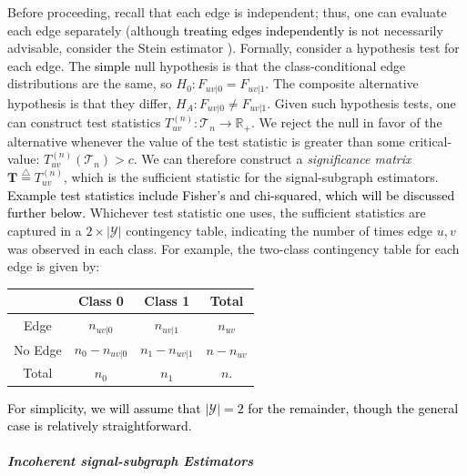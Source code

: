 \documentclass[10pt,journal,cspaper,compsoc]{IEEEtran}
\providecommand{\tk}[1]{\textcolor{black}{#1}}
\providecommand{\mc}[1]{\mathcal{#1}}
\providecommand{\mb}[1]{\boldsymbol{#1}}
\newcommand{\Real}{\mathbb{R}}
\newcommand{\defeq}{\overset{\triangle}{=}}
\begin{document}
Before proceeding, recall that each edge is independent; thus, one can evaluate each edge separately (although \tk{treating edges independently is} not necessarily advisable, consider the Stein estimator \cite{Stein1956}).  Formally, consider a hypothesis test for each edge.  The \tk{simple} null hypothesis is that the class-conditional edge distributions are the same, so $H_0: F_{uv|0}=F_{uv|1}$.  The composite alternative hypothesis is that they differ, $H_A: F_{uv|0} \neq F_{uv|1}$.  Given such hypothesis tests, one can construct test statistics $T_{uv}^{(n)}: \mc{T}_n \to \Real_+$.  We reject the null in favor of the alternative whenever the value of the test statistic is greater than some critical-value: $T_{uv}^{(n)}(\mc{T}_n)>c$.  We can therefore construct a \emph{significance matrix} $\mb{T} \defeq T_{uv}^{(n)}$, which is the sufficient statistic for the signal-subgraph estimators. %
\tk{Example test statistics include Fisher's and chi-squared, which will be discussed further below.}
Whichever test statistic one uses, the sufficient statistics are captured in a $2 \times |\mc{Y}|$  contingency table, indicating the number of times edge $u,v$ was observed in each class.  For example, the two-class contingency table for each edge is given by:  
% 
\begin{table}[h!]
\begin{center}
\begin{tabular}{c||c|c||c}
 & Class 0  & Class 1 & Total \\
\hline\hline
Edge & $n_{uv|0}$ & $n_{uv|1}$ & $n_{uv}$ \\ \hline
No Edge & $n_0-n_{uv|0}$ & $n_1-n_{uv|1}$ & $n-n_{uv}$ \\ \hline \hline
Total & $n_0$ & $n_1$ & $n$. %
\end{tabular}
\end{center}
\label{tab:contingency}
\end{table}%

\tk{For simplicity, we will assume that $|\mc{Y}|=2$ for the remainder, though the general case is  relatively straightforward.}

\paragraph{\emph{Incoherent signal-subgraph Estimators}} %
\label{par:paragraph_name}
\end{document}
